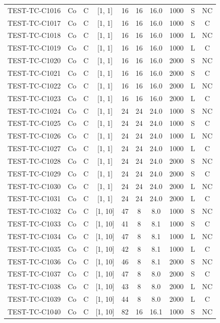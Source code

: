 \begin{longtable}{lccccccccc}
TEST-TC-C1016 & Co & C & [1, 1] & 16 & 16 & 16.0 & 1000 & S & NC \\
TEST-TC-C1017 & Co & C & [1, 1] & 16 & 16 & 16.0 & 1000 & S & C \\
TEST-TC-C1018 & Co & C & [1, 1] & 16 & 16 & 16.0 & 1000 & L & NC \\
TEST-TC-C1019 & Co & C & [1, 1] & 16 & 16 & 16.0 & 1000 & L & C \\
TEST-TC-C1020 & Co & C & [1, 1] & 16 & 16 & 16.0 & 2000 & S & NC \\
TEST-TC-C1021 & Co & C & [1, 1] & 16 & 16 & 16.0 & 2000 & S & C \\
TEST-TC-C1022 & Co & C & [1, 1] & 16 & 16 & 16.0 & 2000 & L & NC \\
TEST-TC-C1023 & Co & C & [1, 1] & 16 & 16 & 16.0 & 2000 & L & C \\
TEST-TC-C1024 & Co & C & [1, 1] & 24 & 24 & 24.0 & 1000 & S & NC \\
TEST-TC-C1025 & Co & C & [1, 1] & 24 & 24 & 24.0 & 1000 & S & C \\
TEST-TC-C1026 & Co & C & [1, 1] & 24 & 24 & 24.0 & 1000 & L & NC \\
TEST-TC-C1027 & Co & C & [1, 1] & 24 & 24 & 24.0 & 1000 & L & C \\
TEST-TC-C1028 & Co & C & [1, 1] & 24 & 24 & 24.0 & 2000 & S & NC \\
TEST-TC-C1029 & Co & C & [1, 1] & 24 & 24 & 24.0 & 2000 & S & C \\
TEST-TC-C1030 & Co & C & [1, 1] & 24 & 24 & 24.0 & 2000 & L & NC \\
TEST-TC-C1031 & Co & C & [1, 1] & 24 & 24 & 24.0 & 2000 & L & C \\
TEST-TC-C1032 & Co & C & [1, 10] & 47 & 8 & 8.0 & 1000 & S & NC \\
TEST-TC-C1033 & Co & C & [1, 10] & 41 & 8 & 8.1 & 1000 & S & C \\
TEST-TC-C1034 & Co & C & [1, 10] & 47 & 8 & 8.1 & 1000 & L & NC \\
TEST-TC-C1035 & Co & C & [1, 10] & 42 & 8 & 8.1 & 1000 & L & C \\
TEST-TC-C1036 & Co & C & [1, 10] & 46 & 8 & 8.1 & 2000 & S & NC \\
TEST-TC-C1037 & Co & C & [1, 10] & 47 & 8 & 8.0 & 2000 & S & C \\
TEST-TC-C1038 & Co & C & [1, 10] & 43 & 8 & 8.0 & 2000 & L & NC \\
TEST-TC-C1039 & Co & C & [1, 10] & 44 & 8 & 8.0 & 2000 & L & C \\
TEST-TC-C1040 & Co & C & [1, 10] & 82 & 16 & 16.1 & 1000 & S & NC \\

\end{longtable}
